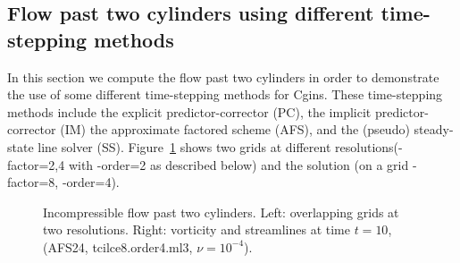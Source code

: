 \documentclass{article}
\begin{document}
\clearpage
\subsection{Flow past two cylinders using different time-stepping methods}

In this section we compute the flow past two cylinders in order
to demonstrate the use of some different time-stepping methods for Cgins.
These time-stepping methods include the explicit predictor-corrector (PC), the implicit predictor-corrector (IM)
the approximate factored scheme (AFS), and the (pseudo) steady-state line solver (SS). 
Figure~\ref{fig:tcilc} shows two grids at different resolutions(-factor=2,4 with -order=2 as described below) and the solution (on a grid -factor=8, -order=4). 
{
\begin{figure}[hbt]
\newcommand{\figWidtha}{8.cm}
\newcommand{\trimfiga}[2]{\trimPlotb{#1}{#2}{.02}{.02}{.275}{.275}}
\begin{center}
\end{center} 
\caption{Incompressible flow past two cylinders. Left: overlapping grids at two resolutions.
         Right: vorticity and streamlines at time $t=10$, (AFS24, tcilce8.order4.ml3, $\nu=10^{-4}$).}
  \label{fig:tcilc}
\end{figure}
}
\end{document}
